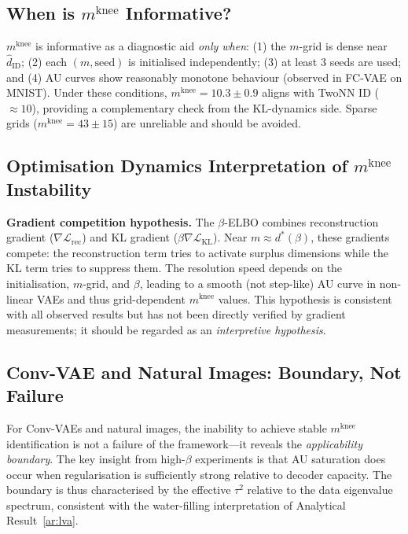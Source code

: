\documentclass[11pt,a4paper]{article}
\newcommand{\mknee}{m^{\mathrm{knee}}}
\newcommand{\hatdID}{\hat{d}_{\mathrm{ID}}}
\begin{document}
\subsection{When is $\mknee$ Informative?}\label{sec:disc_mknee}

$\mknee$ is informative as a diagnostic aid \emph{only when}:
(1) the $m$-grid is dense near $\hatdID$; (2) each $(m,\text{seed})$ is
initialised independently; (3) at least 3 seeds are used; and
(4) AU curves show reasonably monotone behaviour (observed in FC-VAE on MNIST).
Under these conditions, $\mknee=10.3\pm0.9$ aligns with TwoNN ID ($\approx10$),
providing a complementary check from the KL-dynamics side.
Sparse grids ($\mknee=43\pm15$) are unreliable and should be avoided.

\subsection{Optimisation Dynamics Interpretation of $\mknee$ Instability}
\label{sec:disc_grad}

\textbf{Gradient competition hypothesis.}
The $\beta$-ELBO combines reconstruction gradient ($\nabla\mathcal{L}_{\mathrm{rec}}$)
and KL gradient ($\beta\nabla\mathcal{L}_{\mathrm{KL}}$).
Near $m\approx d^*(\beta)$, these gradients compete: the reconstruction term
tries to activate surplus dimensions while the KL term tries to suppress them.
The resolution speed depends on the initialisation, $m$-grid, and $\beta$,
leading to a smooth (not step-like) AU curve in non-linear VAEs and thus
grid-dependent $\mknee$ values.
This hypothesis is consistent with all observed results but has not been
directly verified by gradient measurements; it should be regarded as an
\emph{interpretive hypothesis}.

\subsection{Conv-VAE and Natural Images: Boundary, Not Failure}\label{sec:disc_boundary}

For Conv-VAEs and natural images, the inability to achieve stable $\mknee$
identification is not a failure of the framework---it reveals the
\emph{applicability boundary}.
The key insight from high-$\beta$ experiments is that AU saturation does occur
when regularisation is sufficiently strong relative to decoder capacity.
The boundary is thus characterised by the effective $\tau^2$ relative to the
data eigenvalue spectrum, consistent with the water-filling interpretation of
Analytical Result~\ref{ar:lva}.
\end{document}
